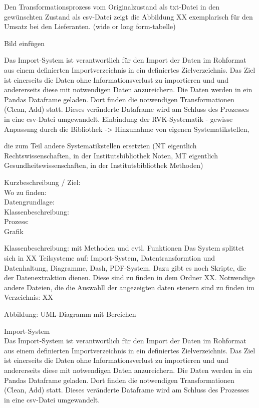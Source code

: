     Den Transformationsprozess vom Originalzustand als txt-Datei in den gewünschten Zustand als csv-Datei zeigt die Abbildung XX exemplarisch für den Umsatz bei den
    Lieferanten. (wide or long form-tabelle)
    
    Bild einfügen
    
    
    Das Import-System ist verantwortlich für den Import der Daten im Rohformat aus einem definierten Importverzeichnis in ein definiertes Zielverzeichnis. Das Ziel
    ist einerseits die Daten ohne Informationsverlust zu importieren und und andererseits diese mit notwendigen Daten anzureichern. Die Daten werden in ein Pandas Dataframe
    geladen. Dort finden die notwendigen Transformationen (Clean, Add) statt. Dieses veränderte Dataframe wird am Schluss des Prozesses in eine csv-Datei umgewandelt.
    Einbindung der RVK-Systematik - gewisse Anpassung durch die Bibliothek -> Hinzunahme von eigenen Systematikstellen,
    
    die zum Teil andere Systematikstellen ersetzten (NT eigentlich Rechtswissenschaften, in der Institutsbibliothek Noten, MT eigentlich
    Gesundheitswissenschaften, in der Institutsbibliothek Methoden)
 
      
    Kurzbeschreibung / Ziel:\\
    Wo zu finden:\\
    Datengrundlage:\\
    Klassenbeschreibung:\\
    Prozess:\\
    
    Grafik
    
    Klassenbeschreibung: mit Methoden und evtl. Funktionen
    Das System splittet sich in XX Teilsysteme auf: Import-System, Datentransformtion und Datenhaltung, Diagramme, Dash, PDF-System. Dazu gibt es noch Skripte,
    die der Datenextraktion dienen. Diese sind zu finden in dem Ordner XX. Notwendige andere Dateien, die die Auswahll der angezeigten daten steuern sind zu finden im          
    Verzeichnis: XX
    
    Abbildung: UML-Diagramm mit Bereichen
    
    
    Import-System\\
    Das Import-System ist verantwortlich für den Import der Daten im Rohformat aus einem definierten Importverzeichnis in ein definiertes Zielverzeichnis. Das Ziel
    ist einerseits die Daten ohne Informationsverlust zu importieren und und andererseits diese mit notwendigen Daten anzureichern. Die Daten werden in ein Pandas Dataframe
    geladen. Dort finden die notwendigen Transformationen (Clean, Add) statt. Dieses veränderte Dataframe wird am Schluss des Prozesses in eine csv-Datei umgewandelt.
    
